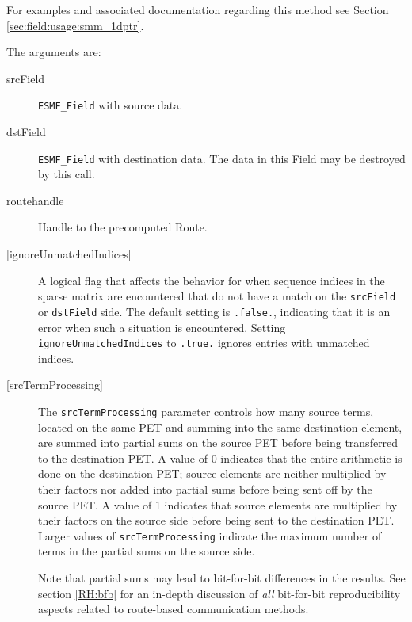    For examples and associated documentation regarding this method see Section
   \ref{sec:field:usage:smm_1dptr}. 
   
   The arguments are:
  
   \begin{description}
  
   \item [srcField]
         {\tt ESMF\_Field} with source data.
  
   \item [dstField]
         {\tt ESMF\_Field} with destination data. The data in this Field may be
       destroyed by this call.
  
   \item [routehandle]
         Handle to the precomputed Route.
  
     \item [{[ignoreUnmatchedIndices]}]
       A logical flag that affects the behavior for when sequence indices 
       in the sparse matrix are encountered that do not have a match on the 
       {\tt srcField} or {\tt dstField} side. The default setting is 
       {\tt .false.}, indicating that it is an error when such a situation is 
       encountered. Setting {\tt ignoreUnmatchedIndices} to {\tt .true.} ignores
       entries with unmatched indices.
  
     \item [{[srcTermProcessing]}]
       The {\tt srcTermProcessing} parameter controls how many source terms,
       located on the same PET and summing into the same destination element,
       are summed into partial sums on the source PET before being transferred
       to the destination PET. A value of 0 indicates that the entire arithmetic
       is done on the destination PET; source elements are neither multiplied
       by their factors nor added into partial sums before being sent off by the
       source PET. A value of 1 indicates that source elements are multiplied
       by their factors on the source side before being sent to the destination
       PET. Larger values of {\tt srcTermProcessing} indicate the maximum number
       of terms in the partial sums on the source side.
  
       Note that partial sums may lead to bit-for-bit differences in the results.
       See section \ref{RH:bfb} for an in-depth discussion of {\em all}
       bit-for-bit reproducibility aspects related to route-based communication
       methods.
  

\end{description}
